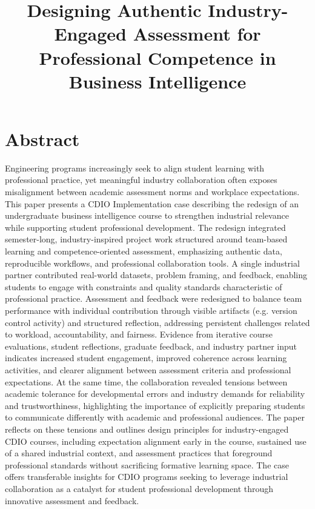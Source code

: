 \documentclass[11pt]{cdio}
\title{Designing Authentic Industry-Engaged Assessment for Professional Competence in Business Intelligence}
\begin{document}

\section{Abstract}
Engineering programs increasingly seek to align student learning with professional practice, yet meaningful industry collaboration often exposes misalignment between academic assessment norms and workplace expectations. This paper presents a CDIO Implementation case describing the redesign of an undergraduate business intelligence course to strengthen industrial relevance while supporting student professional development. The redesign integrated semester-long, industry-inspired project work structured around team-based learning and competence-oriented assessment, emphasizing authentic data, reproducible workflows, and professional collaboration tools. A single industrial partner contributed real-world datasets, problem framing, and feedback, enabling students to engage with constraints and quality standards characteristic of professional practice. Assessment and feedback were redesigned to balance team performance with individual contribution through visible artifacts (e.g. version control activity) and structured reflection, addressing persistent challenges related to workload, accountability, and fairness. Evidence from iterative course evaluations, student reflections, graduate feedback, and industry partner input indicates increased student engagement, improved coherence across learning activities, and clearer alignment between assessment criteria and professional expectations. At the same time, the collaboration revealed tensions between academic tolerance for developmental errors and industry demands for reliability and trustworthiness, highlighting the importance of explicitly preparing students to communicate differently with academic and professional audiences. The paper reflects on these tensions and outlines design principles for industry-engaged CDIO courses, including expectation alignment early in the course, sustained use of a shared industrial context, and assessment practices that foreground professional standards without sacrificing formative learning space. The case offers transferable insights for CDIO programs seeking to leverage industrial collaboration as a catalyst for student professional development through innovative assessment and feedback.
\end{document}
